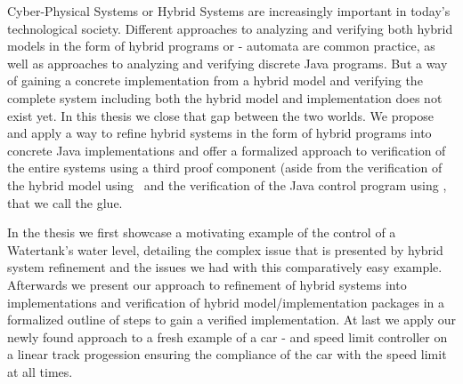 
\Abstract
Cyber-Physical Systems or Hybrid Systems are increasingly important in today's technological society. Different approaches to analyzing and verifying both hybrid models in the form of hybrid programs or - automata are common practice, as well as approaches to analyzing and verifying discrete Java programs. But a  way of gaining a concrete implementation from a hybrid model and verifying the complete system including both the hybrid model and implementation does not exist yet.
In this thesis we close that gap between the two worlds. We propose and apply a way to refine hybrid systems in the form of hybrid programs into concrete Java implementations and offer a formalized approach to verification of the entire systems using a third proof component (aside from the verification of the hybrid model using \keym~and the verification of the Java control program using \key, that we call the glue. 

In the thesis we first showcase a motivating example of the control of a Watertank's water level, detailing the complex issue that is presented by hybrid system refinement and the issues we had with this comparatively easy example. Afterwards we present our approach to refinement of hybrid systems into implementations and verification of hybrid model/implementation packages in a formalized outline of steps to gain a verified implementation. At last we apply our newly found approach to a fresh example of a car - and speed limit controller on a linear track progession ensuring the compliance of the car with the speed limit at all times.